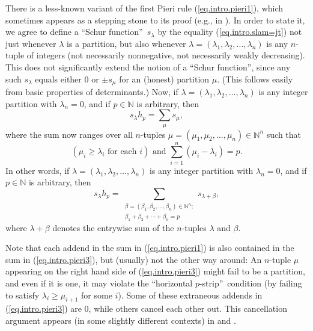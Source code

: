 \documentclass
[numbers=enddot,12pt,final,onecolumn,notitlepage,english]{scrartcl}%
\theoremstyle{definition}
\let\sumnonlimits\sum
\renewcommand{\sum}{\sumnonlimits\limits}
\begin{document}
There is a less-known variant of the first Pieri rule (\ref{eq.intro.pieri1}),
which sometimes appears as a stepping stone to its proof (e.g., in
\cite[\S 2.4]{Tamvak13}). In order to state it, we agree to define a
\textquotedblleft Schur function\textquotedblright\ $s_{\lambda}$ by the
equality (\ref{eq.intro.slam=jt}) not just whenever $\lambda$ is a partition,
but also whenever $\lambda=\left(  \lambda_{1},\lambda_{2},\ldots,\lambda
_{n}\right)  $ is any $n$-tuple of integers (not necessarily nonnegative, not
necessarily weakly decreasing). This does not significantly extend the notion
of a \textquotedblleft Schur function\textquotedblright, since any such
$s_{\lambda}$ equals either $0$ or $\pm s_{\mu}$ for an (honest) partition
$\mu$. (This follows easily from basic properties of determinants.) Now, if
$\lambda=\left(  \lambda_{1},\lambda_{2},\ldots,\lambda_{n}\right)  $ is any
integer partition with $\lambda_{n}=0$, and if $p\in\mathbb{N}$ is arbitrary,
then%
\begin{equation}
s_{\lambda}h_{p}=\sum_{\mu}s_{\mu}, \label{eq.intro.pieri3}%
\end{equation}
where the sum now ranges over all $n$-tuples $\mu=\left(  \mu_{1},\mu
_{2},\ldots,\mu_{n}\right)  \in\mathbb{N}^{n}$ such that
\[
\left(  \mu_{i}\geq\lambda_{i}\text{ for each }i\right)  \text{ and }%
\sum_{i=1}^{n}\left(  \mu_{i}-\lambda_{i}\right)  =p.
\]
In other words, if $\lambda=\left(  \lambda_{1},\lambda_{2},\ldots,\lambda
_{n}\right)  $ is any integer partition with $\lambda_{n}=0$, and if
$p\in\mathbb{N}$ is arbitrary, then%
\begin{equation}
s_{\lambda}h_{p}=\sum_{\substack{\beta=\left(  \beta_{1},\beta_{2}%
,\ldots,\beta_{n}\right)  \in\mathbb{N}^{n};\\\beta_{1}+\beta_{2}+\cdots
+\beta_{n}=p}}s_{\lambda+\beta}, \label{eq.intro.pieri3b}%
\end{equation}
where $\lambda+\beta$ denotes the entrywise sum of the $n$-tuples $\lambda$
and $\beta$.

Note that each addend in the sum in (\ref{eq.intro.pieri1}) is also contained
in the sum in (\ref{eq.intro.pieri3}), but (usually) not the other way around:
An $n$-tuple $\mu$ appearing on the right hand side of (\ref{eq.intro.pieri3})
might fail to be a partition, and even if it is one, it may violate the
\textquotedblleft horizontal $p$-strip\textquotedblright\ condition (by
failing to satisfy $\lambda_{i}\geq\mu_{i+1}$ for some $i$). Some of these
extraneous addends in (\ref{eq.intro.pieri3}) are $0$, while others cancel
each other out. This cancellation argument appears (in some slightly different
contexts) in \cite[Lemma 2]{Tamvak13} and \cite[(2.1) vs. (2.2)]{LakTho07}.
\end{document}
